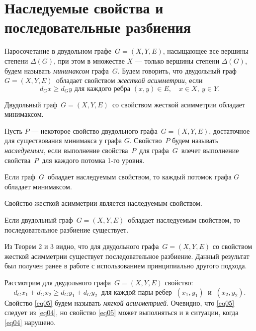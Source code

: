 \section{Наследуемые свойства и последовательные разбиения}
Паросочетание в двудольном графе\ $G=(X,Y,E)$, насыщающее все вершины степени $\Delta(G)$, при этом в множестве $X$ --- только вершины степени $\Delta(G)$,  будем называть \textit{ минимаксом} графа\ $G$.
Будем говорить, что двудольный граф\ $G=(X,Y,E)$\ обладает свойством \textit{ жесткой асимметрии}, если
\begin{equation}\label{eq04}
d_G x\geqslant d_G y \text{ для каждого ребра } (x,y)\in E, \quad x\in X,\  y\in Y.
\end{equation}
\begin{lemma}\label{lem02}
Двудольный граф\ $G=(X,Y,E)$\ со свойством жесткой асимметрии обладает минимаксом.
\end{lemma}
Пусть $P$ --- некоторое свойство двудольного графа\ ${G=(X,Y,E)}$, достаточное для существования минимакса у графа $G$. Свойство\ $P$ будем называть \textit{ наследуемым}, если выполнение свойства\ $P$\ для графа\ $G$\ влечет выполнение свойства\ $P$\ для каждого потомка 1-го уровня.
\begin{remark}\label{rem01}
 Если граф\ $G$\ обладает наследуемым свойством, то каждый потомок графа $G$ обладает минимаксом.
\end{remark}
\begin{theorem}\label{the02}
 Свойство жесткой асимметрии является наследуемым свойством.
 \end{theorem}
\begin{theorem}\label{the03}
 Если двудольный граф\ $G=(X,Y,E)$\ обладает наследуемым свойством, то последовательное разбиение существует.
\end{theorem}
\begin{remark}\label{rem02}
Из Теорем 2 и 3 видно, что для двудольного графа\ ${G=(X,Y,E)}$ со свойством жесткой асимметрии существует последовательное разбиение.
Данный результат был получен ранее в работе \cite{akm-5} с использованием принципиально другого подхода.
\end{remark}

Рассмотрим для двудольного графа\ ${G=(X,Y,E)}$ свойство:
\begin{equation}\label{eq05}
d_G{x_1} + d_G x_2\geqslant d_G y_1+d_G y_2\ \text{ для каждой пары ребер }\  (x_1,y_1)\ \text{ и }\ (x_2,y_2).
\end{equation}
Свойство \eqref{eq05} будем называть \textit{ мягкой асимметрией}. Очевидно, что \eqref{eq05} следует из \eqref{eq04}, но свойство \eqref{eq05} может выполняться и в ситуации, когда \eqref{eq04} нарушено.

